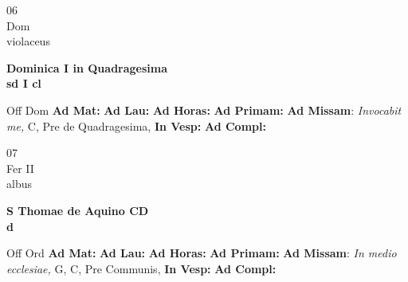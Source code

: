 \documentclass[10pt, openany]{book}
\begin{document}
    \begin{center}
        \begin{minipage}{3.5in}
            \vspace{2em}
            \begin{minipage}{0.5in}
                {\Huge 06} \\
                {\normalsize Dom} \\
                {\normalsize violaceus}
            \end{minipage}
            \begin{minipage}{3.0in}
                \textbf{ \large Dominica I in Quadragesima \\
                \textnormal{\normalsize sd I cl}} \\ 
            \end{minipage}
            \begin{justify}Off Dom
                \textbf{Ad Mat: }
                \textbf{Ad Lau: }
                \textbf{Ad Horas: }
                \textbf{Ad Primam: }\textbf{Ad Missam}: \textit{Invocabit me,} C, Pre de Quadragesima,  
                \textbf{In Vesp: }
                \textbf{Ad Compl: }
            \end{justify}
        \end{minipage}
    \end{center}

    \begin{center}
        \begin{minipage}{3.5in}
            \vspace{2em}
            \begin{minipage}{0.5in}
                {\Huge 07} \\
                {\normalsize Fer II} \\
                {\normalsize albus}
            \end{minipage}
            \begin{minipage}{3.0in}
                \textbf{ \large S Thomae de Aquino CD \\
                \textnormal{\normalsize d}} \\ 
            \end{minipage}
            \begin{justify}Off Ord
                \textbf{Ad Mat: }
                \textbf{Ad Lau: }
                \textbf{Ad Horas: }
                \textbf{Ad Primam: }\textbf{Ad Missam}: \textit{In medio ecclesiae,} G, C, Pre Communis,  
                \textbf{In Vesp: }
                \textbf{Ad Compl: }
            \end{justify}
        \end{minipage}
    \end{center}
\end{document}
